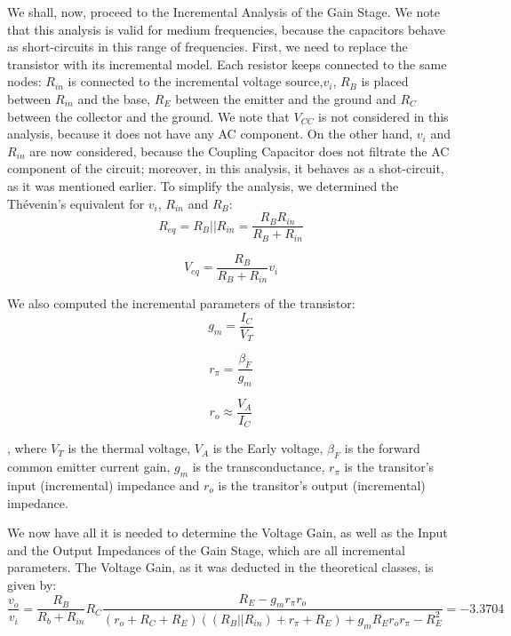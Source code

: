 We shall, now, proceed to the Incremental Analysis of the Gain Stage. We note that this analysis is valid for medium frequencies, because the capacitors behave as short-circuits in this range of frequencies.
First, we need to replace the transistor with its incremental model. Each resistor keeps connected to the same nodes: $R_{in}$ is connected to the incremental voltage source,$v_i$, $R_B$ is placed between $R_{in}$ and the base, $R_E$ between the emitter and the ground and $R_C$ between the collector and the ground. We note that $V_{CC}$ is not considered in this analysis, because it does not have any AC component. On the other hand, $v_i$ and $R_{in}$ are now considered, because the Coupling Capacitor does not filtrate the AC component of the circuit; moreover, in this analysis, it behaves as a shot-circuit, as it was mentioned earlier.
To simplify the analysis, we determined the Thévenin's equivalent for $v_i$, $R_{in}$ and $R_B$:
\begin{equation}
	R_{eq} = R_B || R_{in} = \frac{R_B R_{in}}{R_B + R_{in}}
	\label{eq:ReqGainInc}
\end{equation}

\begin{equation}
	V_{eq} = \frac{R_B}{R_B + R_{in}} v_i
	\label{eq:VeqGainInc}
\end{equation}

We also computed the incremental parameters of the transistor:
\begin{equation}
	g_m = \frac{I_C}{V_T}
	\label{eq:gmGain}
\end{equation}

\begin{equation}
	r_{\pi} = \frac{\beta_F}{g_m}
	\label{rpiGain}
\end{equation}

\begin{equation}
	r_o \approx \frac{V_A}{I_C}
	\label{eq:roGain}
\end{equation}

, where $V_T$ is the thermal voltage, $V_A$ is the Early voltage, $\beta_F$ is the forward common emitter current gain, $g_m$ is the transconductance, $r_{\pi}$ is the transitor's input (incremental) impedance and $r_o$ is the transitor's output (incremental) impedance.

We now have all it is needed to determine the Voltage Gain, as well as the Input and the Output Impedances of the Gain Stage, which are all incremental parameters.
The Voltage Gain, as it was deducted in the theoretical classes, is given by:
\begin{equation}
	\frac{v_o}{v_i} = \frac{R_B}{R_b + R_{in}} R_C \frac{R_E - g_mr_{\pi}r_o}{(r_o + R_C + R_E)((R_B||R_{in}) + r_{\pi} + R_E) + g_mR_Er_or_{\pi} - R_{E}^2} = -3.3704
	\label{eq:GainGStage}
\end{equation}

